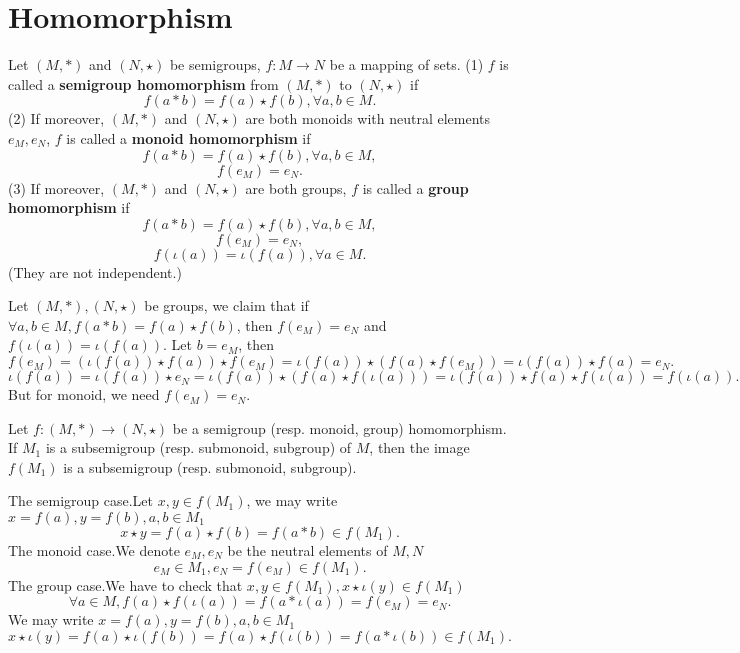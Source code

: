 \documentclass{book}
\numberwithin{equation}{section}
\begin{document}
\section{Homomorphism}
\begin{definitionenv}
    Let $(M, *)$ and $(N, \star)$ be  semigroups,  $f:M\rightarrow N$ be a mapping of sets.
    \newline
    (1) $f$ is called a \textbf{semigroup homomorphism} from $(M, *)$ to $(N, \star)$ if
    $$f(a*b)=f(a)\star f(b), \forall a, b\in M.$$
    (2) If moreover,  $(M, *)$ and $(N, \star)$ are both monoids with neutral elements $e_M, e_N$,  $f$ is called a \textbf{monoid homomorphism} if 
     $$f(a*b)=f(a)\star f(b), \forall a, b\in M, $$ 
     $$f(e_M)=e_N.$$
    (3) If moreover,  $(M, *)$ and $(N, \star)$ are both groups,  $f$ is called a \textbf{group homomorphism} if 
    $$f(a*b)=f(a)\star f(b), \forall a, b\in M, $$
    $$f(e_M)=e_N, $$
    $$f(\iota(a))=\iota(f(a)), \forall a\in M.$$
    (They are not independent.)
\end{definitionenv}
\begin{remark}
    Let $(M,*),(N,\star)$ be groups, we claim that if $\forall a,b\in M,f(a*b)=f(a)\star f(b)$, then $f(e_M)=e_N$ and $f(\iota(a))=\iota(f(a))$. 
    Let $b=e_M$, then 
    {\small$$ f(e_M)=\left(\iota(f(a))\star f(a)\right)\star f(e_M)=\iota(f(a))\star\left( f(a)\star f(e_M)\right)=\iota(f(a))\star f(a)=e_N.$$
    $$\iota(f(a))=\iota(f(a))\star e_N=\iota(f(a))\star\left(f(a)\star f(\iota(a))\right)=\iota(f(a))\star f(a)\star f(\iota(a))=f(\iota(a)).$$}
    But for monoid,  we need $f(e_M)=e_N$.
\end{remark}
\begin{propositionenv}
    \quad 
    \newline
    Let $f:(M, *)\rightarrow (N, \star)$ be a semigroup (resp. monoid, group) homomorphism. If $M_1$ is a subsemigroup (resp. submonoid, subgroup) of $M$,  then the image $f(M_1)$ is a subsemigroup (resp. submonoid, subgroup).
\end{propositionenv}
\begin{proofenv}
    The semigroup case.Let $x, y\in f(M_1)$,  we may write $x=f(a), y=f(b), a, b\in M_1$
    $$x\star y=f(a)\star f(b)=f(a*b)\in f(M_1).$$
    The monoid case.We denote $e_M, e_N$ be the neutral elements of $M, N$
    $$e_M\in M_1, e_N=f(e_M)\in f(M_1).$$
    The group case.We have to check that $x, y\in f(M_1), x\star \iota(y)\in f(M_1)$
    $$\forall a\in M,  f(a)\star f(\iota(a))=f(a*\iota(a))=f(e_M)=e_N.$$
    We may write $x=f(a), y=f(b), a, b\in M_1$
    $$x\star \iota(y)=f(a)\star\iota(f(b))=f(a)\star f(\iota(b))=f(a*\iota(b))\in f(M_1).$$
\end{proofenv}
\end{document}
